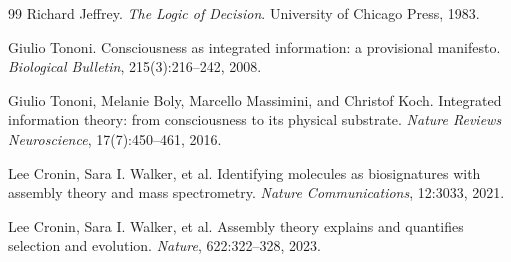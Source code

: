 \documentclass[11pt]{article}
\begin{document}
\begin{thebibliography}{99}
Richard Jeffrey.
\newblock \emph{The Logic of Decision}.
\newblock University of Chicago Press, 1983.

Giulio Tononi.
\newblock Consciousness as integrated information: a provisional manifesto.
\newblock \emph{Biological Bulletin}, 215(3):216--242, 2008.

Giulio Tononi, Melanie Boly, Marcello Massimini, and Christof Koch.
\newblock Integrated information theory: from consciousness to its physical
substrate.
\newblock \emph{Nature Reviews Neuroscience}, 17(7):450--461, 2016.

Lee Cronin, Sara I. Walker, et al.
\newblock Identifying molecules as biosignatures with assembly theory and
mass spectrometry.
\newblock \emph{Nature Communications}, 12:3033, 2021.

Lee Cronin, Sara I. Walker, et al.
\newblock Assembly theory explains and quantifies selection and evolution.
\newblock \emph{Nature}, 622:322--328, 2023.

\end{thebibliography}
\end{document}
